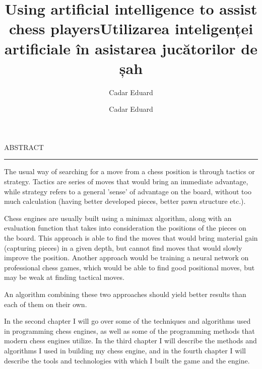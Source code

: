\documentclass[12pt]{report}
\begin{document}
\title{Using artificial intelligence to assist chess players}
\author{Cadar Eduard}
\maketitle

\title{Utilizarea inteligenței artificiale în asistarea jucătorilor de șah}
\author{Cadar Eduard}
\maketitle

\newpage
\thispagestyle{empty}
\mbox{}
\newpage
{} 

\cleardoublepage
ABSTRACT
\vspace{0.5cm}	
\hrule
\vspace{0.5cm}	

The usual way of searching for a move from a chess position is through tactics or strategy. Tactics are series of moves that would bring an immediate advantage, while strategy refers to a general 'sense' of advantage on the board, without too much calculation (having better developed pieces, better pawn structure etc.).\cite{klein2022neural}

Chess engines are usually built using a minimax algorithm, along with an evaluation function that takes into consideration the positions of the pieces on the board. This approach is able to find the moves that would bring material gain (capturing pieces) in a given depth, but cannot find moves that would slowly improve the position. Another approach would be training a neural network on professional chess games, which would be able to find good positional moves, but may be weak at finding tactical moves.

An algorithm combining these two approaches should yield better results than each of them on their own.

In the second chapter I will go over some of the techniques and algorithms used in programming chess engines, as well as some of the programming methods that modern chess engines utilize. In the third chapter I will describe the methods and algorithms I used in building my chess engine, and in the fourth chapter I will describe the tools and technologies with which I built the game and the engine.

\tableofcontents

\newpage
{}












\end{document}
